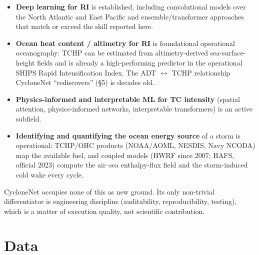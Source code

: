 \documentclass[11pt]{article}
\begin{document}
\begin{itemize}
  \item \textbf{Deep learning for RI} is established, including convolutional
        models over the North Atlantic and East Pacific and
        ensemble/transformer approaches that match or exceed the skill
        reported here.
  \item \textbf{Ocean heat content / altimetry for RI} is foundational
        operational oceanography: TCHP can be estimated from
        altimetry-derived sea-surface-height fields and is already a
        high-performing predictor in the operational SHIPS Rapid
        Intensification Index. The ADT $\leftrightarrow$ TCHP relationship
        CycloneNet ``rediscovers'' (\S5) is decades old.
  \item \textbf{Physics-informed and interpretable ML for TC intensity}
        (spatial attention, physics-informed networks, interpretable
        transformers) is an active subfield.
  \item \textbf{Identifying and quantifying the ocean energy source} of a
        storm is operational: TCHP/OHC products (NOAA/AOML, NESDIS, Navy
        NCODA) map the available fuel, and coupled models (HWRF since 2007;
        HAFS, official 2023) compute the air--sea enthalpy-flux field and the
        storm-induced cold wake every cycle.
\end{itemize}

CycloneNet occupies none of this as new ground. Its only non-trivial
differentiator is engineering discipline (auditability, reproducibility,
testing), which is a matter of execution quality, not scientific contribution.

\section{Data}
\end{document}
